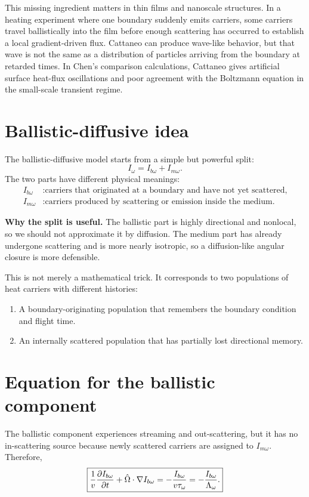 \documentclass[11pt]{article}
\begin{document}
This missing ingredient matters in thin films and nanoscale structures. In a heating experiment where one boundary suddenly emits carriers, some carriers travel ballistically into the film before enough scattering has occurred to establish a local gradient-driven flux. Cattaneo can produce wave-like behavior, but that wave is not the same as a distribution of particles arriving from the boundary at retarded times. In Chen's comparison calculations, Cattaneo gives artificial surface heat-flux oscillations and poor agreement with the Boltzmann equation in the small-scale transient regime.

\section{Ballistic-diffusive idea}
The ballistic-diffusive model starts from a simple but powerful split:
\begin{equation}
    \boxed{I_\omega=I_{b\omega}+I_{m\omega}.}
    \label{eq:bd_intensity_split}
\end{equation}
The two parts have different physical meanings:
\begin{align}
    I_{b\omega} &: \text{carriers that originated at a boundary and have not yet scattered,}\\
    I_{m\omega} &: \text{carriers produced by scattering or emission inside the medium.}
\end{align}

\begin{physicsbox}
\textbf{Why the split is useful.} The ballistic part is highly directional and nonlocal, so we should not approximate it by diffusion. The medium part has already undergone scattering and is more nearly isotropic, so a diffusion-like angular closure is more defensible.
\end{physicsbox}

This is not merely a mathematical trick. It corresponds to two populations of heat carriers with different histories:
\begin{enumerate}[leftmargin=1.6em]
    \item A boundary-originating population that remembers the boundary condition and flight time.
    \item An internally scattered population that has partially lost directional memory.
\end{enumerate}

\section{Equation for the ballistic component}
The ballistic component experiences streaming and out-scattering, but it has no in-scattering source because newly scattered carriers are assigned to \(I_{m\omega}\). Therefore,
\begin{equation}
    \boxed{\frac{1}{v}\frac{\partial I_{b\omega}}{\partial t}
    +\hat{\Omega}\cdot\nabla I_{b\omega}
    =-\frac{I_{b\omega}}{v\tau_\omega}
    =-\frac{I_{b\omega}}{\Lambda_\omega}.}
    \label{eq:ballistic_eq}
\end{equation}
\end{document}
